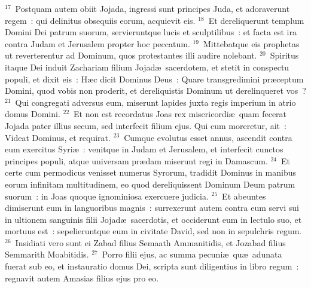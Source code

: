 ${}^{17}$~Postquam autem obiit Jojada, ingressi sunt principes Juda, et adoraverunt regem~: qui delinitus obsequiis eorum, acquievit eis.
${}^{18}$~Et dereliquerunt templum Domini Dei patrum suorum, servieruntque lucis et sculptilibus~: et facta est ira contra Judam et Jerusalem propter hoc peccatum.
${}^{19}$~Mittebatque eis prophetas ut reverterentur ad Dominum, quos protestantes illi audire nolebant.
${}^{20}$~Spiritus itaque Dei induit Zachariam filium Jojad\ae\ sacerdotem, et stetit in conspectu populi, et dixit eis~: H\ae c dicit Dominus Deus~: Quare transgredimini pr\ae ceptum Domini, quod vobis non proderit, et dereliquistis Dominum ut derelinqueret vos~?
${}^{21}$~Qui congregati adversus eum, miserunt lapides juxta regis imperium in atrio domus Domini.
${}^{22}$~Et non est recordatus Joas rex misericordi\ae\ quam fecerat Jojada pater illius secum, sed interfecit filium ejus. Qui cum moreretur, ait~: Videat Dominus, et requirat.
${}^{23}$~Cumque evolutus esset annus, ascendit contra eum exercitus Syri\ae~: venitque in Judam et Jerusalem, et interfecit cunctos principes populi, atque universam pr\ae dam miserunt regi in Damascum.
${}^{24}$~Et certe cum permodicus venisset numerus Syrorum, tradidit Dominus in manibus eorum infinitam multitudinem, eo quod dereliquissent Dominum Deum patrum suorum~: in Joas quoque ignominiosa exercuere judicia.
${}^{25}$~Et abeuntes dimiserunt eum in languoribus magnis~: surrexerunt autem contra eum servi sui in ultionem sanguinis filii Jojad\ae\ sacerdotis, et occiderunt eum in lectulo suo, et mortuus est~: sepelieruntque eum in civitate David, sed non in sepulchris regum.
${}^{26}$~Insidiati vero sunt ei Zabad filius Semaath Ammanitidis, et Jozabad filius Semmarith Moabitidis.
${}^{27}$~Porro filii ejus, ac summa pecuni\ae\ qu\ae\ adunata fuerat sub eo, et instauratio domus Dei, scripta sunt diligentius in libro regum~: regnavit autem Amasias filius ejus pro eo.

